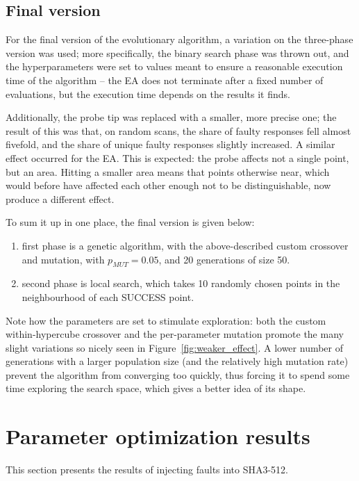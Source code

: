 \documentclass[times, utf8, diplomski]{fer}
\begin{document}
\subsection{Final version}
For the final version of the evolutionary algorithm, a variation on the
three-phase version was used; more specifically, the binary search phase
was thrown out, and the hyperparameters were set to values meant to ensure
a reasonable execution time of the algorithm -- the EA does not terminate
after a fixed number of evaluations, but the execution time depends on the
results it finds.

Additionally, the probe tip was replaced with a smaller, more precise one;
the result of this was that, on random scans, the share of faulty responses
fell almost fivefold, and the share of unique faulty responses slightly increased.
A similar effect occurred for the EA. This is expected: the probe affects not
a single point, but an area. Hitting a smaller area means that points otherwise
near, which would before have affected each other enough not to be distinguishable,
now produce a different effect.

To sum it up in one place, the final version is given below:
\begin{enumerate}
    \item first phase is a genetic algorithm, with the above-described custom crossover
          and mutation, with $p_{MUT} = 0.05$, and 20 generations of size 50.
    \item second phase is local search, which takes 10 randomly chosen points in
          the neighbourhood of each SUCCESS point.
\end{enumerate}

Note how the parameters are set to stimulate exploration: both the custom
within-hypercube crossover and the per-parameter mutation promote the many
slight variations so nicely seen in Figure~\ref{fig:weaker_effect}. A lower
number of generations with a larger population size (and the relatively high
mutation rate) prevent the algorithm from converging too quickly, thus forcing
it to spend some time exploring the search space, which gives a better idea
of its shape.



\section{Parameter optimization results}
This section presents the results of injecting faults into SHA3-512.
\end{document}
